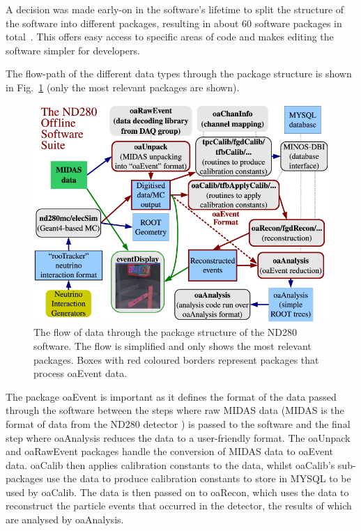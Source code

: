 \documentclass[aps,pra,12pt,notitlepage,tightenlines]{revtex4-1}
\begin{document}
A decision was made early-on in the software's lifetime to split the structure of the software into different packages, resulting in about 60 software packages in total~\cite{ABE2011106}. This offers easy access to specific areas of code and makes editing the software simpler for developers. 

The flow-path of the different data types through the package structure is shown in Fig.\ \ref{fig:struct} (only the most relevant packages are shown). 
\begin{figure}
 \includegraphics[scale=0.5]{struct.png}
 \caption{The flow of data through the package structure of the ND280 software. The flow is simplified and only shows the most relevant packages. Boxes with red coloured borders represent packages that process oaEvent data.~\cite{ABE2011106}}
 \label{fig:struct}
\end{figure}
The package oaEvent is important as it defines the format of the data passed through the software between the steps where raw MIDAS data (MIDAS is the format of data from the ND280 detector \cite{Ritt2001}) is passed to the software and the final step where oaAnalysis reduces the data to a user-friendly format. The oaUnpack and oaRawEvent packages handle the conversion of MIDAS data to oaEvent data. oaCalib then applies calibration constants to the data, whilst oaCalib's sub-packages use the data to produce calibration constants to store in MYSQL to be used by oaCalib. The data is then passed on to oaRecon, which uses the data to reconstruct the particle events that occurred in the detector, the results of which are analysed by oaAnalysis.
\end{document}
